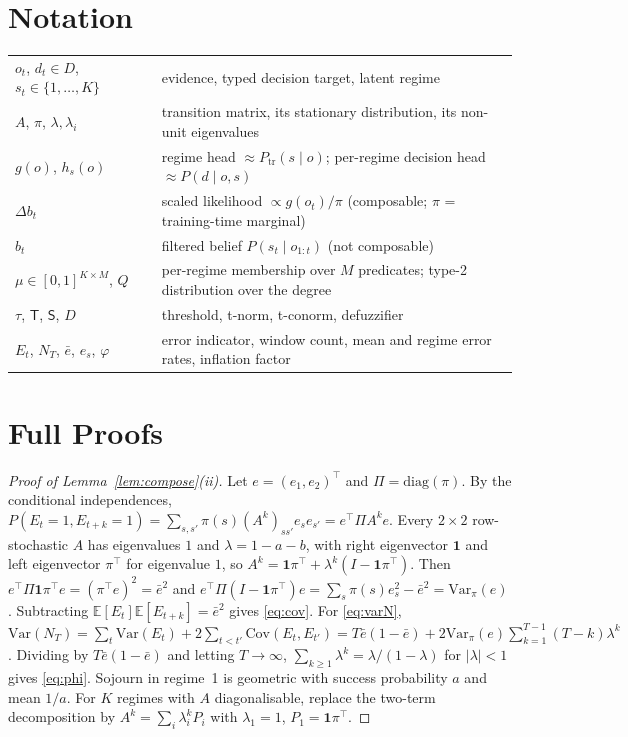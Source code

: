 \documentclass[11pt,a4paper]{article}
\numberwithin{equation}{section}
\theoremstyle{plain}
\theoremstyle{definition}
\theoremstyle{remark}
\newcommand{\E}{\mathbb{E}}
\newcommand{\Var}{\mathrm{Var}}
\newcommand{\Cov}{\mathrm{Cov}}
\newcommand{\ptrain}{P_{\mathrm{tr}}}
\begin{document}
\appendix

\section{Notation}\label{app:notation}
\begin{center}\small
\begin{tabularx}{\textwidth}{@{}lX@{}}
\toprule
$o_t$, $d_t\in D$, $s_t\in\{1,\dots,K\}$ & evidence, typed decision target, latent regime\\
$A$, $\pi$, $\lambda,\lambda_i$ & transition matrix, its stationary distribution, its non-unit eigenvalues\\
$g(o)$, $h_s(o)$ & regime head $\approx\ptrain(s\mid o)$; per-regime decision head $\approx P(d\mid o,s)$\\
$\Delta b_t$ & scaled likelihood $\propto g(o_t)/\pi$ (composable; $\pi$ = training-time marginal)\\
$b_t$ & filtered belief $P(s_t\mid o_{1:t})$ (not composable)\\
$\mu\in[0,1]^{K\times M}$, $Q$ & per-regime membership over $M$ predicates; type-2 distribution over the degree\\
$\tau$, $\mathsf T$, $\mathsf S$, $D$ & threshold, t-norm, t-conorm, defuzzifier\\
$E_t$, $N_T$, $\bar e$, $e_s$, $\varphi$ & error indicator, window count, mean and regime error rates, inflation factor\\
\bottomrule
\end{tabularx}
\end{center}

\section{Full Proofs}\label{app:proofs}

\begin{proof}[Proof of Lemma~\ref{lem:compose}(ii)]
Let $e=(e_1,e_2)^\top$ and $\Pi=\mathrm{diag}(\pi)$. By the conditional independences, $P(E_t=1,E_{t+k}=1)=\sum_{s,s'}\pi(s)(A^k)_{ss'}e_se_{s'}=e^\top\Pi A^ke$. Every $2\times2$ row-stochastic $A$ has eigenvalues $1$ and $\lambda=1-a-b$, with right eigenvector $\mathbf 1$ and left eigenvector $\pi^\top$ for eigenvalue $1$, so $A^k=\mathbf 1\pi^\top+\lambda^k(I-\mathbf 1\pi^\top)$. Then $e^\top\Pi\mathbf 1\pi^\top e=(\pi^\top e)^2=\bar e^2$ and $e^\top\Pi(I-\mathbf 1\pi^\top)e=\sum_s\pi(s)e_s^2-\bar e^2=\Var_\pi(e)$. Subtracting $\E[E_t]\E[E_{t+k}]=\bar e^2$ gives \eqref{eq:cov}. For \eqref{eq:varN}, $\Var(N_T)=\sum_t\Var(E_t)+2\sum_{t<t'}\Cov(E_t,E_{t'})=T\bar e(1-\bar e)+2\Var_\pi(e)\sum_{k=1}^{T-1}(T-k)\lambda^k$. Dividing by $T\bar e(1-\bar e)$ and letting $T\to\infty$, $\sum_{k\ge1}\lambda^k=\lambda/(1-\lambda)$ for $|\lambda|<1$ gives \eqref{eq:phi}. Sojourn in regime~1 is geometric with success probability $a$ and mean $1/a$. For $K$ regimes with $A$ diagonalisable, replace the two-term decomposition by $A^k=\sum_i\lambda_i^kP_i$ with $\lambda_1=1$, $P_1=\mathbf 1\pi^\top$.
\end{proof}
\end{document}
